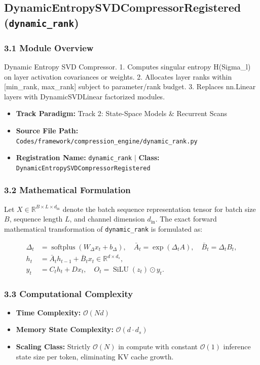 \subsection{DynamicEntropySVDCompressorRegistered (\texttt{dynamic\_rank})}
\label{sec:app_module_dynamic_rank}

\subsubsection*{3.1 Module Overview}
Dynamic Entropy SVD Compressor.  1. Computes singular entropy H(Sigma\_l) on layer activation covariances or weights. 2. Allocates layer ranks within [min\_rank, max\_rank] subject to parameter/rank budget. 3. Replaces nn.Linear layers with DynamicSVDLinear factorized modules.
\begin{itemize}
    \item \textbf{Track Paradigm:} Track 2: State-Space Models & Recurrent Scans
    \item \textbf{Source File Path:} \texttt{Codes/framework/compression\_engine/dynamic\_rank.py}
    \item \textbf{Registration Name:} \texttt{dynamic\_rank} $\mid$ \textbf{Class:} \texttt{DynamicEntropySVDCompressorRegistered}
\end{itemize}

\subsubsection*{3.2 Mathematical Formulation}
Let $X \in \mathbb{R}^{B \times L \times d_{\text{in}}}$ denote the batch sequence representation tensor for batch size $B$, sequence length $L$, and channel dimension $d_{\text{in}}$. The exact forward mathematical transformation of \texttt{dynamic\_rank} is formulated as:

\begin{align}
\Delta_t &= \operatorname{softplus}(W_\Delta x_t + b_\Delta), \quad \bar{A}_t = \exp(\Delta_t A), \quad \bar{B}_t = \Delta_t B_t, \\
h_t &= \bar{A}_t h_{t-1} + \bar{B}_t x_t \in \mathbb{R}^{d \times d_s}, \\
y_t &= C_t h_t + D x_t, \quad O_t = \operatorname{SiLU}(z_t) \odot y_t.
\end{align}


\subsubsection*{3.3 Computational Complexity}
\begin{itemize}
    \item \textbf{Time Complexity:} $\mathcal{O}(N d)$
    \item \textbf{Memory State Complexity:} $\mathcal{O}(d \cdot d_s)$
    \item \textbf{Scaling Class:} Strictly $\mathcal{O}(N)$ in compute with constant $\mathcal{O}(1)$ inference state size per token, eliminating KV cache growth.
\end{itemize}

